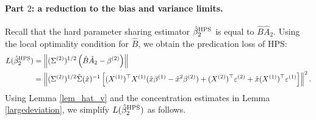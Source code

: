 \paragraph{Part $2$: a reduction to the bias and variance limits.}
Recall that the hard parameter sharing estimator $\hat{\beta}_2^{\textup{HPS}}$ is equal to $\hat{B} \hat{A}_2$.
Using the local optimality condition for $\hat{B}$, we obtain the predication loss of HPS:
\begin{align}
L(\hat{\beta}_2^{\textup{HPS}}) &=\left\|(\Sigma^{(2)})^{1/2} \left( \hat B \hat A_2 - \beta^{(2)}\right)\right\| \nonumber\\
&=  \left\| (\Sigma^{(2)})^{1/2}\hat \Sigma(\hat x)^{-1} \left[(X^{(1)})^\top X^{(1)} (\hat x\beta^{(1)}-\hat x^2\beta^{(2)})+ (X^{(2)})^\top \varepsilon^{(2)} + \hat x   (X^{(1)})^\top \varepsilon^{(1)} \right]\right\|^2.\label{Lbeta_HPS}
\end{align}
Using Lemma \ref{lem_hat_v} and the concentration estimates in Lemma \ref{largedeviation}, we simplify $L(\hat{\beta}_2^{\textup{HPS}})$ as follows.

